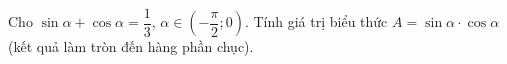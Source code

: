 \begin{ex}
Cho $\sin\alpha+\cos\alpha=\dfrac13$, $\alpha\in\left(-\dfrac{\pi}{2};0\right)$. Tính giá trị biểu thức $A=\sin\alpha\cdot\cos\alpha$ (kết quả làm tròn đến hàng phần chục).
\end{ex}
